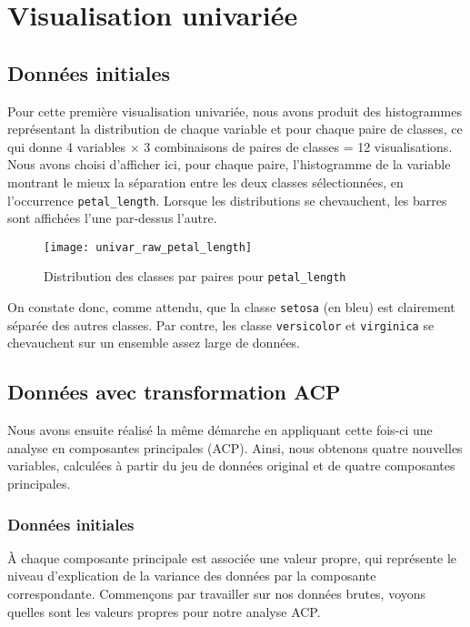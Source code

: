 \documentclass[french]{report}
\begin{document}
    \chapter{Visualisation univariée}
    
    \section{Données initiales}
    
    Pour cette première visualisation univariée, nous avons produit des histogrammes représentant la distribution de chaque variable et pour chaque paire de classes, ce qui donne 4 variables $\times$ 3 combinaisons de paires de classes = 12 visualisations.
    Nous avons choisi d'afficher ici, pour chaque paire, l'histogramme de la variable montrant le mieux la séparation entre les deux classes sélectionnées, en l'occurrence \texttt{petal\_length}.
    Lorsque les distributions se chevauchent, les barres sont affichées l'une par-dessus l'autre.
    
    \begin{figure}[h]
        \centering
        \texttt{[image: univar\_raw\_petal\_length]}
        \caption{Distribution des classes par paires pour \texttt{petal\_length}}
    \end{figure}
    
    On constate donc, comme attendu, que la classe \texttt{setosa} (en bleu) est clairement séparée des autres classes.
    Par contre, les classe \texttt{versicolor} et \texttt{virginica} se chevauchent sur un ensemble assez large de données.

    \section{Données avec transformation ACP}
    
    Nous avons ensuite réalisé la même démarche en appliquant cette fois-ci une analyse en composantes principales (ACP).
    Ainsi, nous obtenons quatre nouvelles variables, calculées à partir du jeu de données original et de quatre composantes principales.
    
    \subsection{Données initiales}
    
    À chaque composante principale est associée une valeur propre, qui représente le niveau d'explication de la variance des données par la composante correspondante.
    Commençons par travailler sur nos données brutes, voyons quelles sont les valeurs propres pour notre analyse ACP.
    
\end{document}
